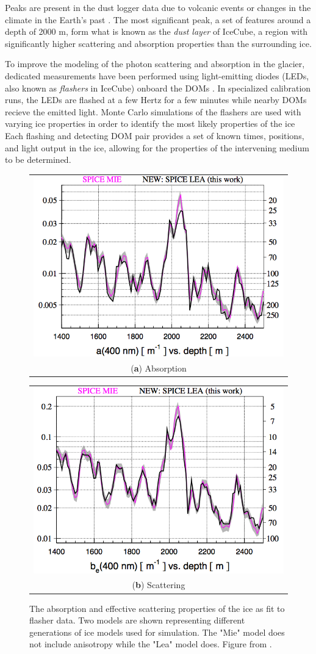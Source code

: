 Peaks are present in the dust logger data due to volcanic events or changes in the climate in the Earth's past \cite{IceCube-DustLogger1,}.
The most significant peak, a set of features around a depth of 2000 m, form what is known as the \emph{dust layer} of IceCube, a region with significantly higher scattering and absorption properties than the surrounding ice.

To improve the modeling of the photon scattering and absorption in the glacier, dedicated measurements have been performed using light-emitting diodes (LEDs, also known as \emph{flashers} in IceCube) onboard the DOMs \cite{IceCube-SpiceMie, Description-IceCube}.
In specialized calibration runs, the LEDs are flashed at a few Hertz for a few minutes while nearby DOMs recieve the emitted light.
Monte Carlo simulations of the flashers are used with varying ice properties in order to identify the most likely properties of the ice
Each flashing and detecting DOM pair provides a set of known times, positions, and light output in the ice, allowing for the properties of the intervening medium to be determined.

\begin{figure}[h]
\centering
\begin{tabular}[b]{c}
  \includegraphics[width=0.45\linewidth]{absorption.png} \\
  \small (\textbf{\color{ctcolormain}a}) Absorption
\end{tabular} \hspace{2pt}
\begin{tabular}[b]{c}
  \includegraphics[width=0.45\linewidth]{scattering.png} \\
  \small (\textbf{\color{ctcolormain}b}) Scattering
\end{tabular}
\caption[The absorption and scattering properties of the ice]{The absorption and effective scattering properties of the ice as fit to flasher data. Two models are shown representing different generations of ice models used for simulation. The "Mie" model does not include anisotropy while the "Lea" model does. Figure from \cite{IceCube-SpiceLea}.}
\label{fig:spicelea}
\end{figure}

